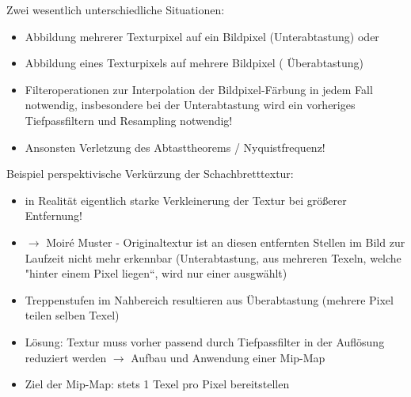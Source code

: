 \documentclass[10pt,landscape]{article}
\begin{document}
\begin{multicols}{3}
Zwei wesentlich unterschiedliche Situationen:
\begin{itemize}
  \item Abbildung mehrerer Texturpixel auf ein Bildpixel (Unterabtastung) oder
  \item Abbildung eines Texturpixels auf mehrere Bildpixel ( Überabtastung)
  \item Filteroperationen zur Interpolation der Bildpixel-Färbung in jedem Fall notwendig, insbesondere bei der Unterabtastung wird ein vorheriges Tiefpassfiltern und Resampling notwendig!
  \item Ansonsten Verletzung des Abtasttheorems / Nyquistfrequenz!
\end{itemize}

Beispiel perspektivische Verkürzung der Schachbretttextur:
\begin{itemize}
  \item in Realität eigentlich starke Verkleinerung der Textur bei größerer Entfernung!
  \item $\rightarrow$ Moiré Muster - Originaltextur ist an diesen entfernten Stellen im Bild zur Laufzeit nicht mehr erkennbar (Unterabtastung, aus mehreren Texeln, welche "hinter einem Pixel liegen“, wird nur einer ausgwählt)
  \item Treppenstufen im Nahbereich resultieren aus Überabtastung (mehrere Pixel teilen selben Texel)
  \item Lösung: Textur muss vorher passend durch Tiefpassfilter in der Auflösung reduziert werden $\rightarrow$ Aufbau und Anwendung einer Mip-Map
  \item Ziel der Mip-Map: stets 1 Texel pro Pixel bereitstellen
\end{itemize}



\end{multicols}
\end{document}

